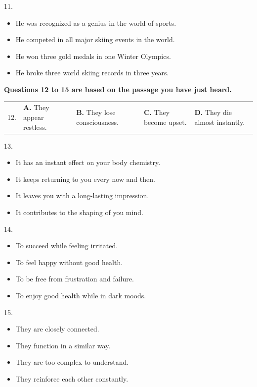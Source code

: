 \documentclass[UTF8,11pt]{ctexart}
\begin{document}
11.


\begin{itemize}[leftmargin=2em,itemsep=.2em,topsep=.4em]\item[A.] He was recognized as a genius in the world of sports.
\item[B.] He competed in all major skiing events in the world.
\item[C.] He won three gold medals in one Winter Olympics.
\item[D.] He broke three world skiing records in three years.
\end{itemize}

\textbf{Questions 12 to 15 are based on the passage you have just heard.}


\noindent\begin{tabularx}{\linewidth}{@{}lXXXX@{}}12. & \textbf{A.} They appear restless. & \textbf{B.} They lose consciousness. & \textbf{C.} They become upset. & \textbf{D.} They die almost instantly.\\\end{tabularx}\par

13.


\begin{itemize}[leftmargin=2em,itemsep=.2em,topsep=.4em]\item[A.] It has an instant effect on your body chemistry.
\item[B.] It keeps returning to you every now and then.
\item[C.] It leaves you with a long-lasting impression.
\item[D.] It contributes to the shaping of you mind.
\end{itemize}

14.


\begin{itemize}[leftmargin=2em,itemsep=.2em,topsep=.4em]\item[A.] To succeed while feeling irritated.
\item[B.] To feel happy without good health.
\item[C.] To be free from frustration and failure.
\item[D.] To enjoy good health while in dark moods.
\end{itemize}

15.


\begin{itemize}[leftmargin=2em,itemsep=.2em,topsep=.4em]\item[A.] They are closely connected.
\item[B.] They function in a similar way.
\item[C.] They are too complex to understand.
\item[D.] They reinforce each other constantly.
\end{itemize}
\end{document}
